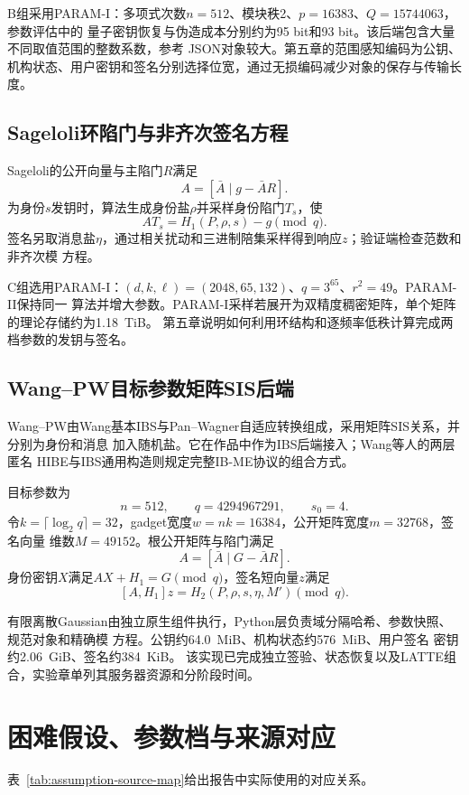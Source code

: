 B组采用PARAM-I：多项式次数$n=512$、模块秩2、$p=16383$、$Q=15744063$，参数评估中的
量子密钥恢复与伪造成本分别约为95 bit和93 bit。该后端包含大量不同取值范围的整数系数，参考
JSON对象较大。第五章的范围感知编码为公钥、机构状态、用户密钥和签名分别选择位宽，通过无损编码减少对象的保存与传输长度。

\subsection{Sageloli环陷门与非齐次签名方程}

Sageloli的公开向量与主陷门$R$满足
\[
 A=[\bar A\mid g-\bar AR].
\]
为身份$s$发钥时，算法生成身份盐$\rho$并采样身份陷门$T_s$，使
\[
 AT_s=H_1(P,\rho,s)-g\pmod q.
\]
签名另取消息盐$\eta$，通过相关扰动和三进制陪集采样得到响应$z$；验证端检查范数和非齐次模
方程\cite{sageloli2023ibs}。

C组选用PARAM-I：$(d,k,\ell)=(2048,65,132)$、$q=3^{65}$、$r^2=49$。PARAM-II保持同一
算法并增大参数。PARAM-I采样若展开为双精度稠密矩阵，单个矩阵的理论存储约为1.18~TiB。
第五章说明如何利用环结构和逐频率低秩计算完成两档参数的发钥与签名。

\subsection{Wang--PW目标参数矩阵SIS后端}

Wang--PW由Wang基本IBS与Pan--Wagner自适应转换组成，采用矩阵SIS关系，并分别为身份和消息
加入随机盐\cite{wang2024ibme,pan2021ibs}。它在作品中作为IBS后端接入；Wang等人的两层匿名
HIBE与IBS通用构造则规定完整IB-ME协议的组合方式。

目标参数为
\[
 n=512,\qquad q=4294967291,\qquad s_0=4.
\]
令$k=\lceil\log_2q\rceil=32$，gadget宽度$w=nk=16384$，公开矩阵宽度$m=32768$，签名向量
维数$M=49152$。根公开矩阵与陷门满足
\[
 A=[\bar A\mid G-\bar AR].
\]
身份密钥$X$满足$AX+H_1=G\pmod q$，签名短向量$z$满足
\[
 [A,H_1]z=H_2(P,\rho,s,\eta,M')\pmod q.
\]

有限离散Gaussian由独立原生组件执行，Python层负责域分隔哈希、参数快照、规范对象和精确模
方程。公钥约64.0~MiB、机构状态约576~MiB、用户签名
密钥约2.06~GiB、签名约384~KiB。
该实现已完成独立签验、状态恢复以及LATTE组合，实验章单列其服务器资源和分阶段时间。

\section{困难假设、参数档与来源对应}

表~\ref{tab:assumption-source-map}给出报告中实际使用的对应关系。

